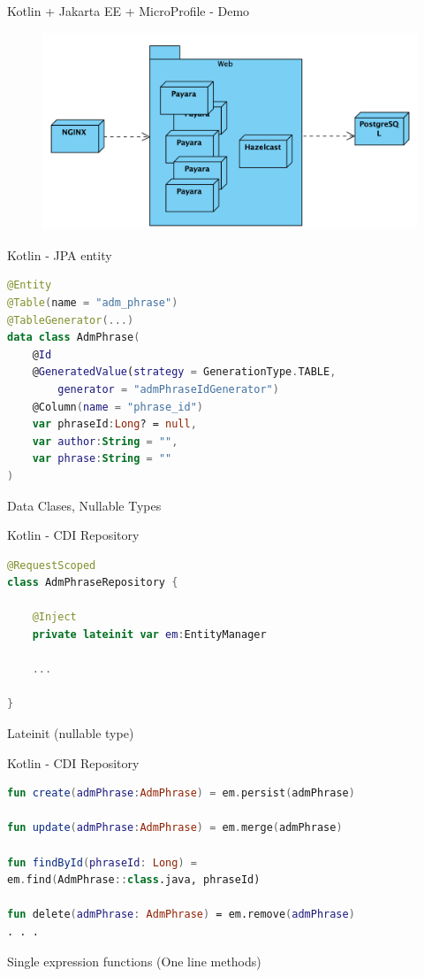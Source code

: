 \documentclass[aspectratio=169]{beamer}
\begin{document}
\begin{frame}{Kotlin + Jakarta EE + MicroProfile  - Demo}
\begin{figure}
	\centering
	\includegraphics[width=\linewidth]{Images/integrum-deployment}
\end{figure}
\end{frame}


\begin{frame}[fragile]{Kotlin - JPA entity}
\begin{lstlisting}[language=Kotlin]
@Entity
@Table(name = "adm_phrase")
@TableGenerator(...)
data class AdmPhrase(
    @Id
    @GeneratedValue(strategy = GenerationType.TABLE,
        generator = "admPhraseIdGenerator")
    @Column(name = "phrase_id")
    var phraseId:Long? = null,
    var author:String = "",
    var phrase:String = ""
)
\end{lstlisting}
Data Clases, Nullable Types
\end{frame}

\begin{frame}[fragile]{Kotlin - CDI Repository}
\begin{lstlisting}[language=Kotlin]
@RequestScoped
class AdmPhraseRepository {

    @Inject
    private lateinit var em:EntityManager
    
    ...

}
\end{lstlisting}
Lateinit (nullable type)
\end{frame}

\begin{frame}[fragile]{Kotlin - CDI Repository}
\begin{lstlisting}[language=Kotlin]
fun create(admPhrase:AdmPhrase) = em.persist(admPhrase)

fun update(admPhrase:AdmPhrase) = em.merge(admPhrase)

fun findById(phraseId: Long) =
em.find(AdmPhrase::class.java, phraseId)

fun delete(admPhrase: AdmPhrase) = em.remove(admPhrase)
. . .
\end{lstlisting}
Single expression functions (One line methods)
\end{frame}
\end{document}
